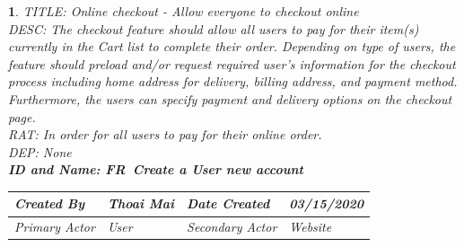 \documentclass{scrreprt}
\theoremstyle{funreq}
\newtheorem{funreq}{}
\begin{document}
	\begin{funreq}
		\label{online_checkout}
		TITLE: Online checkout - Allow everyone to checkout online\\
		DESC: The checkout feature should allow all users to pay for their item(s) currently in the Cart list to complete their order. Depending on type of users, the feature should preload and/or request required user’s information for the checkout process including home address for delivery, billing address, and payment method. Furthermore, the users can specify payment and delivery options on the checkout page.\\
		RAT: In order for all users to pay for their online order.\\
		DEP: None\\
		
		\bfseries{ID and Name: FR\thefunreq ~\hspace{.6cm}Create a User new account}
		\begin{table}[h!]
			\begin{tabularx}{\columnwidth}{|X|X|X|X|}
				\hline
				Created By    & Thoai Mai & Date Created    & 03/15/2020 \\ \hline
				Primary Actor & User        & Secondary Actor & Website \\ \hline
			\end{tabularx}
		
\end{table}
\end{funreq}
\end{document}
